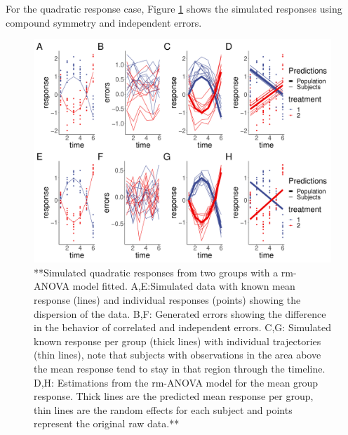 \documentclass[
]{article}
\begin{document}
For the quadratic response case, Figure \ref{fig:quadratic-cases} shows the simulated responses using compound symmetry and independent errors.

\begin{figure}[!h]
\includegraphics{Manuscript_AM_v4_files/figure-latex/quadratic-cases-1} \caption{**Simulated quadratic responses from two groups with a rm-ANOVA model fitted. A,E:Simulated data with known mean response (lines) and individual responses (points) showing the dispersion of the data. B,F: Generated errors showing the difference in the behavior of correlated and independent errors.  C,G: Simulated known response per group (thick lines) with individual trajectories (thin lines), note that subjects with observations in the area above the mean response tend to stay in that region through the timeline. D,H: Estimations from the rm-ANOVA model for the mean group response. Thick lines are the predicted mean response per group, thin lines are the random effects for each subject and points represent the original raw data.**}\label{fig:quadratic-cases}
\end{figure}
\end{document}
